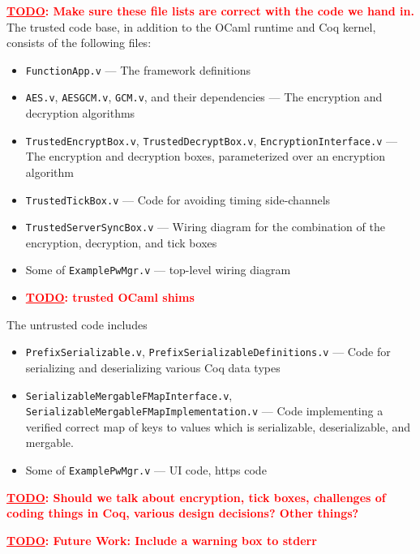 \documentclass{article}
\newcommand{\todo}[1]{\textbf{\textcolor{red}{\underline{TODO}: #1}}}
\begin{document}
\todo{Make sure these file lists are correct with the code we hand in.}
The trusted code base, in addition to the OCaml runtime and Coq kernel, consists of the following files:
\begin{itemize}
  \item \texttt{FunctionApp.v} --- The framework definitions
  \item \texttt{AES.v}, \texttt{AESGCM.v}, \texttt{GCM.v}, and their dependencies --- The encryption and decryption algorithms
  \item \texttt{TrustedEncryptBox.v}, \texttt{TrustedDecryptBox.v}, \texttt{EncryptionInterface.v} --- The encryption and decryption boxes, parameterized over an encryption algorithm
  \item \texttt{TrustedTickBox.v} --- Code for avoiding timing side-channels
  \item \texttt{TrustedServerSyncBox.v} --- Wiring diagram for the combination of the encryption, decryption, and tick boxes
  \item Some of \texttt{ExamplePwMgr.v} --- top-level wiring diagram
  \item \todo{trusted OCaml shims}
\end{itemize}


The untrusted code includes
\begin{itemize}
  \item \texttt{PrefixSerializable.v}, \texttt{PrefixSerializableDefinitions.v} --- Code for serializing and deserializing various Coq data types
  \item \texttt{SerializableMergableFMapInterface.v}, \texttt{SerializableMergableFMapImplementation.v} --- Code implementing a verified correct map of keys to values which is serializable, deserializable, and mergable.
  \item Some of \texttt{ExamplePwMgr.v} --- UI code, https code
\end{itemize}

\todo{Should we talk about encryption, tick boxes, challenges of coding things in Coq, various design decisions?  Other things?}

\todo{Future Work: Include a warning box to stderr}
\end{document}
